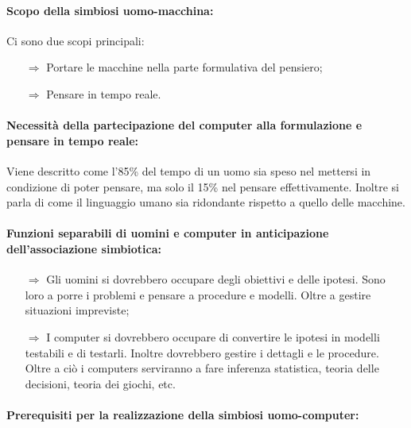 \paragraph{Scopo della simbiosi uomo-macchina:} Ci sono due scopi principali:

\begin{itemize}
    \item [$\Rightarrow$] Portare le macchine nella parte formulativa del pensiero;
    \item [$\Rightarrow$] Pensare in tempo reale.
\end{itemize}

\paragraph{Necessità della partecipazione del computer alla formulazione e 
pensare in tempo reale:} Viene descritto come l'85\% del tempo di un uomo sia speso nel 
mettersi in condizione di poter pensare, ma solo il 15\% nel pensare effettivamente.
Inoltre si parla di come il linguaggio umano sia ridondante rispetto a quello delle macchine.

\paragraph{Funzioni separabili di uomini e computer in anticipazione dell'associazione
simbiotica:} 

\begin{itemize}
    \item [$\Rightarrow$] Gli uomini si dovrebbero occupare degli obiettivi e delle ipotesi.
    Sono loro a porre i problemi e pensare a procedure e modelli. Oltre a gestire situazioni impreviste;
    \item [$\Rightarrow$] I computer si dovrebbero occupare di convertire le ipotesi in modelli 
    testabili e di testarli. Inoltre dovrebbero gestire i dettagli e le procedure. Oltre a ciò 
    i computers serviranno a fare inferenza statistica, teoria delle decisioni, teoria dei giochi, etc.
\end{itemize}

\paragraph{Prerequisiti per la realizzazione della simbiosi uomo-computer:}

